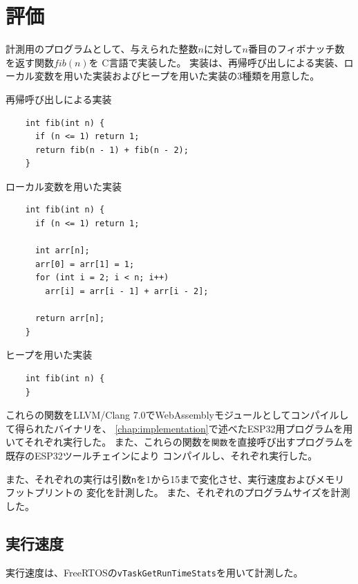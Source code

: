 \chapter{評価}
\label{chap:evaluation}

計測用のプログラムとして、与えられた整数$n$に対して$n$番目のフィボナッチ数を返す関数$fib(n)$を
C言語で実装した。
実装は、再帰呼び出しによる実装、ローカル変数を用いた実装およびヒープを用いた実装の3種類を用意した。

\begin{itembox}[l]{再帰呼び出しによる実装}
  \begin{verbatim}
    int fib(int n) {
      if (n <= 1) return 1;
      return fib(n - 1) + fib(n - 2);
    }
  \end{verbatim}
\end{itembox}

\begin{itembox}[l]{ローカル変数を用いた実装}
  \begin{verbatim}
    int fib(int n) {
      if (n <= 1) return 1;

      int arr[n];
      arr[0] = arr[1] = 1;
      for (int i = 2; i < n; i++)
        arr[i] = arr[i - 1] + arr[i - 2];

      return arr[n];
    }
  \end{verbatim}
\end{itembox}

\begin{itembox}[l]{ヒープを用いた実装}
  \begin{verbatim}
    int fib(int n) {
    }
  \end{verbatim}
\end{itembox}

これらの関数をLLVM/Clang 7.0でWebAssemblyモジュールとしてコンパイルして得られたバイナリを、
\ref{chap:implementation}で述べたESP32用プログラムを用いてそれぞれ実行した。
また、これらの関数を\verb|関数|を直接呼び出すプログラムを既存のESP32ツールチェインにより
コンパイルし、それぞれ実行した。

また、それぞれの実行は引数\verb|n|を1から15まで変化させ、実行速度およびメモリフットプリントの
変化を計測した。
また、それぞれのプログラムサイズを計測した。

\section{実行速度}

実行速度は、FreeRTOSの\verb|vTaskGetRunTimeStats|を用いて計測した。

